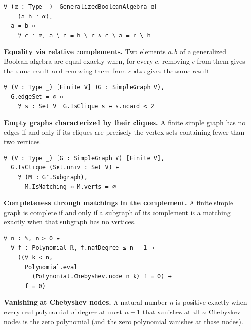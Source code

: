 \begin{list}{}
\item
\begin{samepage}
\begin{lstlisting}[basicstyle=\ttfamily\footnotesize,frame=single,breaklines=true]
∀ (α : Type _) [GeneralizedBooleanAlgebra α]
    (a b : α),
  a = b ↔
    ∀ c : α, a \ c = b \ c ∧ c \ a = c \ b
\end{lstlisting}
\noindent\textbf{Equality via relative complements.}
Two elements $a,b$ of a generalized Boolean algebra are equal exactly when,
for every $c$, removing $c$ from them gives the same result and removing them
from $c$ also gives the same result.
\end{samepage}

\item
\begin{samepage}
\begin{lstlisting}[basicstyle=\ttfamily\footnotesize,frame=single,breaklines=true]
∀ (V : Type _) [Finite V] (G : SimpleGraph V),
  G.edgeSet = ∅ ↔
    ∀ s : Set V, G.IsClique s ↔ s.ncard < 2
\end{lstlisting}
\noindent\textbf{Empty graphs characterized by their cliques.}
A finite simple graph has no edges if and only if its cliques are precisely the
vertex sets containing fewer than two vertices.
\end{samepage}

\item
\begin{samepage}
\begin{lstlisting}[basicstyle=\ttfamily\footnotesize,frame=single,breaklines=true]
∀ (V : Type _) (G : SimpleGraph V) [Finite V],
  G.IsClique (Set.univ : Set V) ↔
    ∀ (M : Gᶜ.Subgraph),
      M.IsMatching ↔ M.verts = ∅
\end{lstlisting}
\noindent\textbf{Completeness through matchings in the complement.}
A finite simple graph is complete if and only if a subgraph of its complement
is a matching exactly when that subgraph has no vertices.
\end{samepage}

\item
\begin{samepage}
\begin{lstlisting}[basicstyle=\ttfamily\footnotesize,frame=single,breaklines=true]
∀ n : ℕ, n > 0 ↔
  ∀ f : Polynomial ℝ, f.natDegree ≤ n - 1 →
    ((∀ k < n,
      Polynomial.eval
        (Polynomial.Chebyshev.node n k) f = 0) ↔
      f = 0)
\end{lstlisting}
\noindent\textbf{Vanishing at Chebyshev nodes.}
A natural number $n$ is positive exactly when every real polynomial of degree
at most $n-1$ that vanishes at all $n$ Chebyshev nodes is the zero polynomial
(and the zero polynomial vanishes at those nodes).
\end{samepage}


\end{list}
